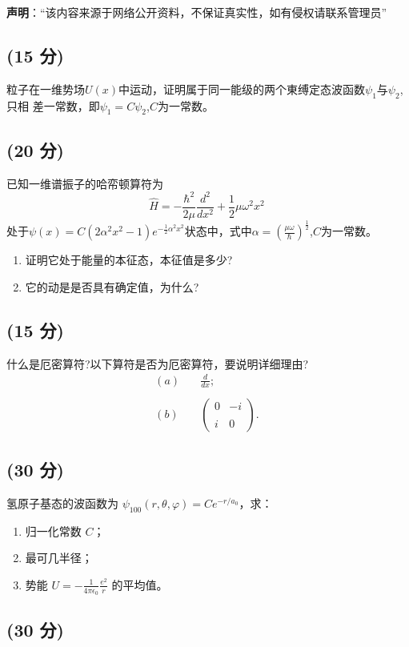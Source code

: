 
\textbf{声明}：“该内容来源于网络公开资料，不保证真实性，如有侵权请联系管理员”

\subsection{(15 分)}
粒子在一维势场$U(x)$中运动，证明属于同一能级的两个東缚定态波函数$\psi_1$与$\psi_2$,只相
差一常数，即$\psi_1=C\psi_2$,$C$为一常数。
\subsection{(20 分)}
已知一维谱振子的哈帟顿算符为$$\hat{H} = -\frac{\hbar^2}{2\mu} \frac{d^2}{dx^2} + \frac{1}{2}\mu \omega^2 x^2~$$处于$\psi(x) = C(2\alpha^2x^2 - 1)e^{-\frac{1}{2}\alpha^2x^2}$状态中，式中$\alpha = \left( \frac{\mu \omega}{\hbar} \right)^{\frac{1}{2}}$,$C$为一常数。
\begin{enumerate}
\item 证明它处于能量的本征态，本征值是多少?
\item 它的动是是否具有确定值，为什么?
\end{enumerate}
\subsection{(15 分)}
什么是厄密算符?以下算符是否为厄密算符，要说明详细理由?
\begin{equation}
\begin{aligned}
(a) & \quad \frac{d}{dx}; \\\\
(b) & \quad \begin{pmatrix}
0 & -i \\\\
i & 0
\end{pmatrix}.
\end{aligned}~
\end{equation}
\subsection{(30 分)}
 氢原子基态的波函数为 $\psi_{100}(r, \theta, \varphi) = Ce^{-r/a_0}$，求：
 \begin{enumerate}
 \item 归一化常数 $C$；
 \item 最可几半径；
 \item 势能 $U = -\frac{1}{4 \pi \epsilon_0} \frac{e^2}{r}$ 的平均值。
 \end{enumerate}
 \subsection{(30 分)}